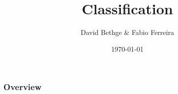 \documentclass{beamer}
\title[Classification]{Classification} %
\author{David Bethge \& Fabio Ferreira} %
\institute[] %
{
DHBW Karlsruhe \\ %
\medskip
\textit{} %
}
\date{\today} %
\begin{document}
\begin{frame}
\titlepage %
\end{frame}

\begin{frame}
\frametitle{Overview} %
\tableofcontents %
\end{frame}



\end{document}
